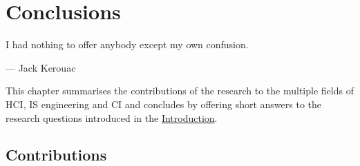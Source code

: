 \chapter{Conclusions}
\label{chap:conclusions}

\ifpdf
    \graphicspath{{Chapter8/Figs/Raster/}{Chapter8/Figs/PDF/}{Chapter8/Figs/}}
\else
    \graphicspath{{Chapter8/Figs/Vector/}{Chapter8/Figs/}}
\fi

\epigraph{I had nothing to offer anybody except my own confusion.}{--- \textup{Jack Kerouac}}

This chapter summarises the contributions of the research to the multiple fields of HCI, IS engineering and CI and concludes by offering short answers to the research questions introduced in the \hyperlink{questions}{Introduction}.

\section{Contributions}

